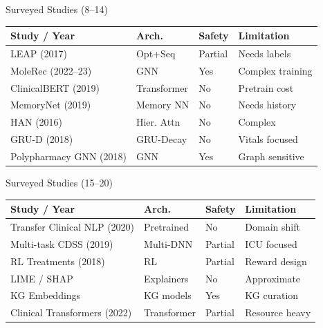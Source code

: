 \begin{frame}{Surveyed Studies (8--14)}
\small
\begin{tabularx}{\textwidth}{@{}p{} l l X@{}}
\toprule
\textbf{Study / Year} & \textbf{Arch.} & \textbf{Safety} & \textbf{Limitation} \\
\midrule
LEAP (2017) \cite{zhang2017leap} & Opt+Seq & Partial & Needs labels \\
MoleRec (2022–23) \cite{moleRec} & GNN & Yes & Complex training \\
ClinicalBERT (2019) \cite{alsentzer2019clinicalbert} & Transformer & No & Pretrain cost \\
MemoryNet (2019) \cite{wang2019memory} & Memory NN & No & Needs history \\
HAN (2016) \cite{yang2016han} & Hier. Attn & No & Complex \\
GRU-D (2018) \cite{che2018grud} & GRU-Decay & No & Vitals focused \\
Polypharmacy GNN (2018) \cite{zitnik2018polypharmacy} & GNN & Yes & Graph sensitive \\
\bottomrule
\end{tabularx}
\end{frame}

\begin{frame}{Surveyed Studies (15--20)}
\small
\begin{tabularx}{\textwidth}{@{}p{} l l X@{}}
\toprule
\textbf{Study / Year} & \textbf{Arch.} & \textbf{Safety} & \textbf{Limitation} \\
\midrule
Transfer Clinical NLP (2020) \cite{lee2020transfer} & Pretrained & No & Domain shift \\
Multi-task CDSS (2019) \cite{harutyunyan2019multitask} & Multi-DNN & Partial & ICU focused \\
RL Treatments (2018) \cite{komorowski2018rl} & RL & Partial & Reward design \\
LIME / SHAP \cite{ribeiro2016lime} & Explainers & No & Approximate \\
KG Embeddings \cite{kg_embeddings} & KG models & Yes & KG curation \\
Clinical Transformers (2022) \cite{transformer_clinical2022} & Transformer & Partial & Resource heavy \\
\bottomrule
\end{tabularx}
\end{frame}

